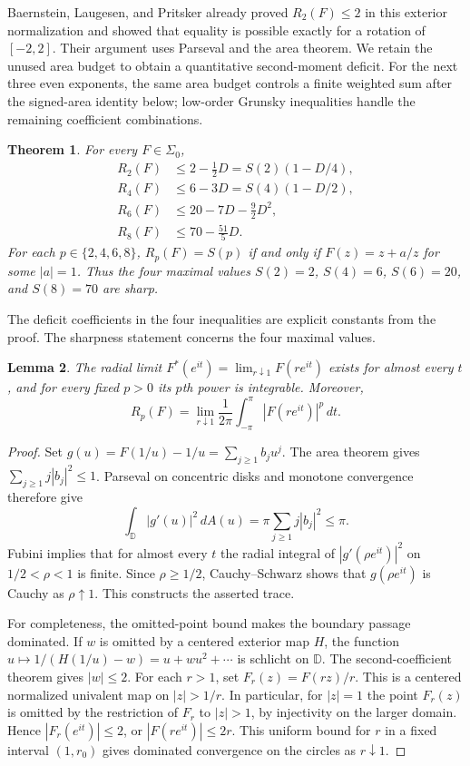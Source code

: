 \documentclass[11pt]{article}
\newtheorem{theorem}{Theorem}
\newtheorem{lemma}[theorem]{Lemma}
\newcommand{\D}{\mathbb D}
\begin{document}
	Baernstein, Laugesen, and Pritsker \cite[Section 6, pp.~78--79]{BLP}
	already proved $R_2(F)\le2$ in this exterior normalization and showed
	that equality is possible exactly for a rotation of $[-2,2]$. Their
	argument uses Parseval and the area theorem. We retain the unused
	area budget to obtain a quantitative second-moment deficit. For the
	next three even exponents, the same area budget controls a finite
	weighted sum after the signed-area identity below; low-order Grunsky
	inequalities handle the remaining coefficient combinations.
	
	\begin{theorem}\label{thm:moments}
		For every $F\in\Sigma_0$,
		\begin{align}
			R_2(F)&\le 2-\tfrac12D=S(2)(1-D/4),\label{eq:m2}\\
			R_4(F)&\le 6-3D=S(4)(1-D/2),\label{eq:m4}\\
			R_6(F)&\le 20-7D-\tfrac92D^2,\label{eq:m6}\\
			R_8(F)&\le 70-\tfrac{51}{5}D.\label{eq:m8}
		\end{align}
		For each $p\in\{2,4,6,8\}$, $R_p(F)=S(p)$ if and only if
		$F(z)=z+a/z$ for some $|a|=1$. Thus the four maximal values
		$S(2)=2$, $S(4)=6$, $S(6)=20$, and $S(8)=70$ are sharp.
	\end{theorem}
	
	The deficit coefficients in the four inequalities are explicit constants
	from the proof. The sharpness statement concerns the four maximal values.
	
	\begin{lemma}\label{lem:trace}
		The radial limit $F^*(e^{it})=\lim_{r\downarrow1}F(re^{it})$ exists for almost
		every $t$, and for every fixed $p>0$ its $p$th power is integrable. Moreover,
		\[
		R_p(F)=\lim_{r\downarrow1}\frac1{2\pi}\int_{-\pi}^{\pi}
		|F(re^{it})|^p\,dt.
		\]
	\end{lemma}
	\begin{proof}
		Set $g(u)=F(1/u)-1/u=\sum_{j\ge1}b_ju^j$. The area theorem gives
		$\sum_{j\ge1}j|b_j|^2\le1$. Parseval on concentric disks and monotone
		convergence therefore give
		\[
		\int_{\D}|g'(u)|^2\,dA(u)=\pi\sum_{j\ge1}j|b_j|^2\le\pi.
		\]
		Fubini implies that for almost every $t$ the radial integral of
		$|g'(\rho e^{it})|^2$ on $1/2<\rho<1$ is finite. Since $\rho\ge1/2$,
		Cauchy--Schwarz shows that $g(\rho e^{it})$ is Cauchy as $\rho\uparrow1$.
		This constructs the asserted trace.
		
		For completeness, the omitted-point bound makes the boundary passage
		dominated. If $w$ is omitted by a centered exterior map $H$, the function
		$u\mapsto 1/(H(1/u)-w)=u+wu^2+\cdots$ is schlicht on $\D$.
		The second-coefficient theorem gives $|w|\le2$. For each $r>1$, set
		$F_r(z)=F(rz)/r$. This is a centered normalized univalent map on
		$|z|>1/r$. In particular, for $|z|=1$ the point $F_r(z)$ is omitted
		by the restriction of $F_r$ to $|z|>1$, by injectivity on the larger
		domain. Hence $|F_r(e^{it})|\le2$, or
		$|F(re^{it})|\le2r$. This uniform bound for $r$ in a fixed interval
		$(1,r_0)$ gives dominated convergence on the circles as $r\downarrow1$.
	\end{proof}
	
\end{document}

